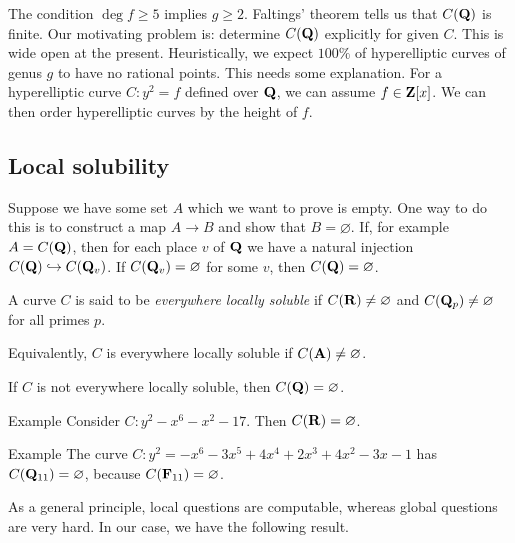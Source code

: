 The condition $\deg f\geqslant 5$ implies $g\geqslant 2$. Faltings' theorem 
tells us that $C(\mathbf{Q})$ is finite. Our motivating problem is: determine 
$C(\mathbf{Q})$ explicitly for given $C$. This is wide open at the present. 
Heuristically, we expect $100\%$ of hyperelliptic curves of genus $g$ to have 
no rational points. This needs some explanation. For a hyperelliptic curve 
$C:y^2=f$ defined over $\mathbf{Q}$, we can assume $f\in \mathbf{Z}[x]$. We can then order 
hyperelliptic curves by the height of $f$. 





\subsection{Local solubility}

Suppose we have some set $A$ which we want to prove is empty. One way to 
do this is to construct a map $A\to B$ and show that $B=\varnothing$. If, for 
example $A=C(\mathbf{Q})$, then for each place $v$ of $\mathbf{Q}$ we have a natural 
injection $C(\mathbf{Q})\hookrightarrow C(\mathbf{Q}_v)$. If $C(\mathbf{Q}_v)=\varnothing$ for 
some $v$, then $C(\mathbf{Q})=\varnothing$. 

\begin{defi}
A curve $C$ is said to be \emph{everywhere locally soluble} if 
$C(\mathbf{R})\ne\varnothing$ and $C(\mathbf{Q}_p)\ne\varnothing$ for all primes $p$. 
\end{defi}

Equivalently, $C$ is everywhere locally soluble if $C(\mathbf{A})\ne\varnothing$. 

\begin{theo}
If $C$ is not everywhere locally soluble, then $C(\mathbf{Q})=\varnothing$. 
\end{theo}

\begin{enonce}[remark]{Example}
Consider $C:y^2-x^6-x^2-17$. Then $C(\mathbf{R})=\varnothing$. 
\end{enonce}

\begin{enonce}[remark]{Example}
The curve $C:y^2=-x^6-3 x^5+4 x^4+2 x^3 +4 x^2 - 3 x-1$ has 
$C(\mathbf{Q}_{11})=\varnothing$, because $C(\mathbf{F}_{11})=\varnothing$. 
\end{enonce}

As a general principle, local questions are computable, whereas global 
questions are very hard. In our case, we have the following result. 

